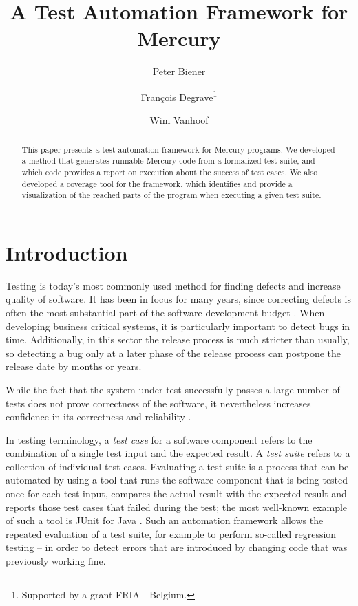 \documentclass[british]{llncs}
\begin{document}
\title{A Test Automation Framework for Mercury}


\author{Peter Biener\and Fran\c{c}ois Degrave\thanks{Supported by a grant FRIA - Belgium.} \and Wim Vanhoof}


\maketitle
\begin{abstract}
This paper presents a test automation framework for Mercury programs.
We developed a method that generates runnable Mercury code from a
formalized test suite, and which code provides a report on execution
about the success of test cases. We also developed a coverage tool
for the framework, which identifies and provide a visualization of the reached parts of the program when
executing a given test suite.
\end{abstract}

\section{Introduction}

Testing is today's most commonly used method for finding defects and
increase quality of software. It has been in focus for many years,
since correcting defects is often the most substantial part of the
software development budget \cite{book:glass}. When developing business
critical systems, it is particularly important to detect bugs in time.
Additionally, in this sector the release process is much stricter
than usually, so detecting a bug only at a later phase of the release
process can postpone the release date by months or years. 



{}While the fact that the system under test successfully passes a large
number of tests does not prove correctness of the software, it nevertheless
increases confidence in its correctness and reliability \cite{book:kaner}.




In testing terminology, a \emph{test case} for a software component refers to the combination
of a single test input and the expected result. A \emph{test
suite} refers to a collection of individual test cases. Evaluating
a test suite is a process that can be automated by using a tool that
runs the software component that is being tested once for each test
input, compares the actual result with the expected result and reports
those test cases that failed during the test; the most well-known
example of such a tool is JUnit for Java \cite{12hunt}. Such an automation
framework allows the repeated evaluation of a test suite, for example
to perform so-called regression testing -- in order to detect errors
that are introduced by changing code that was previously working fine.
\end{document}
